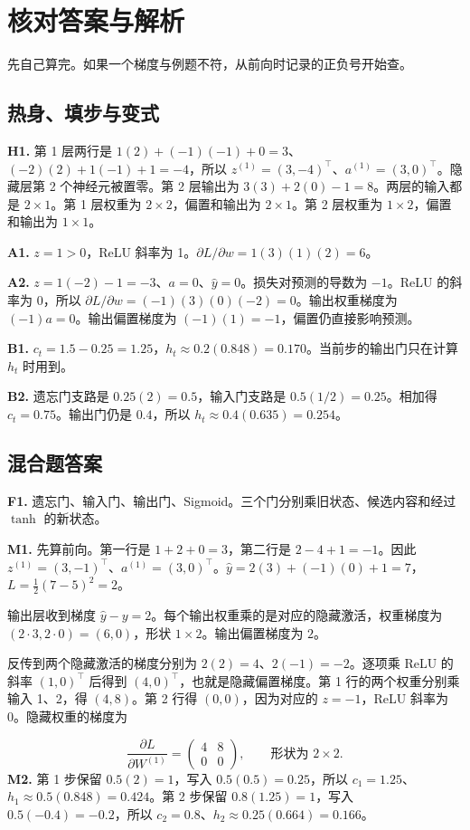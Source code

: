 \documentclass[UTF8,a4paper,11pt]{ctexart}
\begin{document}
\section{核对答案与解析}
先自己算完。如果一个梯度与例题不符，从前向时记录的正负号开始查。

\subsection{热身、填步与变式}
\textbf{H1.} 第 1 层两行是 $1(2)+(-1)(-1)+0=3$、$(-2)(2)+1(-1)+1=-4$，所以 $z^{(1)}=(3,-4)^\top$、$a^{(1)}=(3,0)^\top$。隐藏层第 2 个神经元被置零。第 2 层输出为 $3(3)+2(0)-1=8$。两层的输入都是 $2\times1$。第 1 层权重为 $2\times2$，偏置和输出为 $2\times1$。第 2 层权重为 $1\times2$，偏置和输出为 $1\times1$。

\textbf{A1.} $z=1>0$，ReLU 斜率为 1。$\partial L/\partial w=1(3)(1)(2)=6$。

\textbf{A2.} $z=1(-2)-1=-3$、$a=0$、$\hat y=0$。损失对预测的导数为 $-1$。ReLU 的斜率为 0，所以 $\partial L/\partial w=(-1)(3)(0)(-2)=0$。输出权重梯度为 $(-1)a=0$。输出偏置梯度为 $(-1)(1)=-1$，偏置仍直接影响预测。

\textbf{B1.} $c_t=1.5-0.25=1.25$，$h_t\approx0.2(0.848)=0.170$。当前步的输出门只在计算 $h_t$ 时用到。

\textbf{B2.} 遗忘门支路是 $0.25(2)=0.5$，输入门支路是 $0.5(1/2)=0.25$。相加得 $c_t=0.75$。输出门仍是 $0.4$，所以 $h_t\approx0.4(0.635)=0.254$。

\clearpage
\subsection{混合题答案}
\textbf{F1.} 遗忘门、输入门、输出门、Sigmoid。三个门分别乘旧状态、候选内容和经过 $\tanh$ 的新状态。

\textbf{M1.} 先算前向。第一行是 $1+2+0=3$，第二行是 $2-4+1=-1$。因此 $z^{(1)}=(3,-1)^\top$、$a^{(1)}=(3,0)^\top$。$\hat y=2(3)+(-1)(0)+1=7$，$L=\tfrac12(7-5)^2=2$。

输出层收到梯度 $\hat y-y=2$。每个输出权重乘的是对应的隐藏激活，权重梯度为 $(2\cdot3,2\cdot0)=(6,0)$，形状 $1\times2$。输出偏置梯度为 $2$。

反传到两个隐藏激活的梯度分别为 $2(2)=4$、$2(-1)=-2$。逐项乘 ReLU 的斜率 $(1,0)^\top$ 后得到 $(4,0)^\top$，也就是隐藏偏置梯度。第 1 行的两个权重分别乘输入 1、2，得 $(4,8)$。第 2 行得 $(0,0)$，因为对应的 $z=-1$，ReLU 斜率为 0。隐藏权重的梯度为

\[\frac{\partial L}{\partial W^{(1)}}=\begin{pmatrix}4&8\\0&0\end{pmatrix},\qquad \text{形状为 }2\times2.\]
\textbf{M2.} 第 1 步保留 $0.5(2)=1$，写入 $0.5(0.5)=0.25$，所以 $c_1=1.25$、$h_1\approx0.5(0.848)=0.424$。第 2 步保留 $0.8(1.25)=1$，写入 $0.5(-0.4)=-0.2$，所以 $c_2=0.8$、$h_2\approx0.25(0.664)=0.166$。
\end{document}
